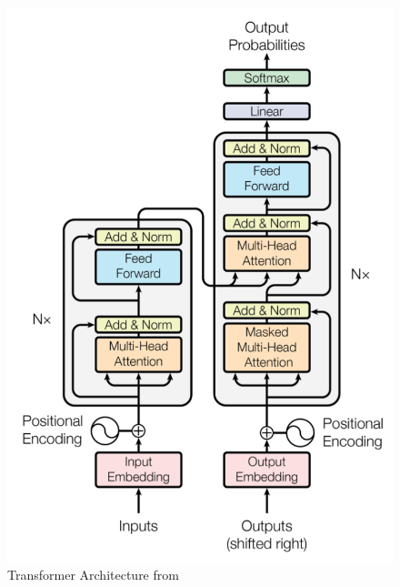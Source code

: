 \begin{figure}[H]
    \centering
    \centering
    \includegraphics[width=0.45\linewidth]{Images/Transformer_architecture3.png}
    \caption{Transformer Architecture from\cite{vaswani2017attention}}
    \label{fig:Tranformer}
\end{figure}
